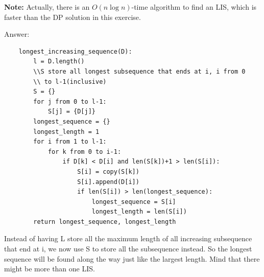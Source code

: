\documentclass[12pt]{article}
\begin{document}
\begin{enumerate}
\begin{enumerate}

\textbf{Note:} Actually, there is an $O(n\log n)$-time algorithm to find an LIS, which is faster than the DP solution in this exercise.
{\color{blue}Answer:
\begin{verbatim}
    longest_increasing_sequence(D):
        l = D.length()
        \\S store all longest subsequence that ends at i, i from 0
        \\ to l-1(inclusive)
        S = {} 
        for j from 0 to l-1:
            S[j] = {D[j]}
        longest_sequence = {}
        longest_length = 1
        for i from 1 to l-1:
            for k from 0 to i-1:
                if D[k] < D[i] and len(S[k])+1 > len(S[i]):
                    S[i] = copy(S[k])
                    S[i].append(D[i])
                    if len(S[i]) > len(longest_sequence): 
                        longest_sequence = S[i]
                        longest_length = len(S[i])
        return longest_sequence, longest_length
\end{verbatim} Instead of having L store all the maximum length of all increasing subsequence that end at i, we now use S to store all the subsequence instead. So the longest sequence will be found along the way just like the largest length. Mind that there might be more than one LIS.}
\end{enumerate}

\end{enumerate}
\end{document}
